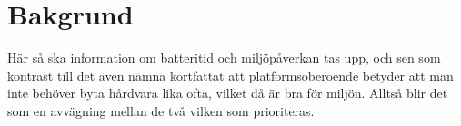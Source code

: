 \section{Bakgrund}
\label{sec:joel_a-background}

Här så ska information om batteritid och miljöpåverkan tas upp, och sen som kontrast till det även nämna kortfattat att platformsoberoende betyder att man inte behöver byta hårdvara lika ofta, vilket då är bra för miljön. Alltså blir det som en avvägning mellan de två vilken som prioriteras.

